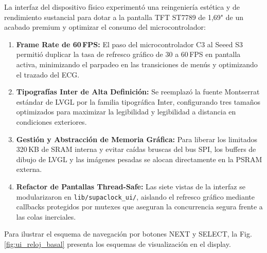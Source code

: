 \documentclass[letterpaper,11pt]{article}
\newcommand{\rfigura}[1]{Fig.\,\ref{#1}}
\begin{document}
La interfaz del dispositivo físico experimentó una reingeniería estética y de rendimiento sustancial para dotar a la pantalla TFT ST7789 de 1,69" de un acabado premium y optimizar el consumo del microcontrolador:
\begin{enumerate}
    \item \textbf{Frame Rate de 60\,FPS:} El paso del microcontrolador C3 al Seeed S3 permitió duplicar la tasa de refresco gráfico de 30 a 60\,FPS en pantalla activa, minimizando el parpadeo en las transiciones de menús y optimizando el trazado del ECG.
    \item \textbf{Tipografías Inter de Alta Definición:} Se reemplazó la fuente Montserrat estándar de LVGL por la familia tipográfica Inter, configurando tres tamaños optimizados para maximizar la legibilidad y legibilidad a distancia en condiciones exteriores.
    \item \textbf{Gestión y Abstracción de Memoria Gráfica:} Para liberar los limitados 320\,KB de SRAM interna y evitar caídas bruscas del bus SPI, los buffers de dibujo de LVGL y las imágenes pesadas se alocan directamente en la PSRAM externa.
    \item \textbf{Refactor de Pantallas Thread-Safe:} Las siete vistas de la interfaz se modularizaron en \texttt{lib/}\allowbreak\texttt{supaclock\_ui/}, aislando el refresco gráfico mediante callbacks protegidos por mutexes que aseguran la concurrencia segura frente a las colas inerciales.
\end{enumerate}

Para ilustrar el esquema de navegación por botones NEXT y SELECT, la \rfigura{fig:ui_reloj_basal} presenta los esquemas de visualización en el display.
\end{document}
